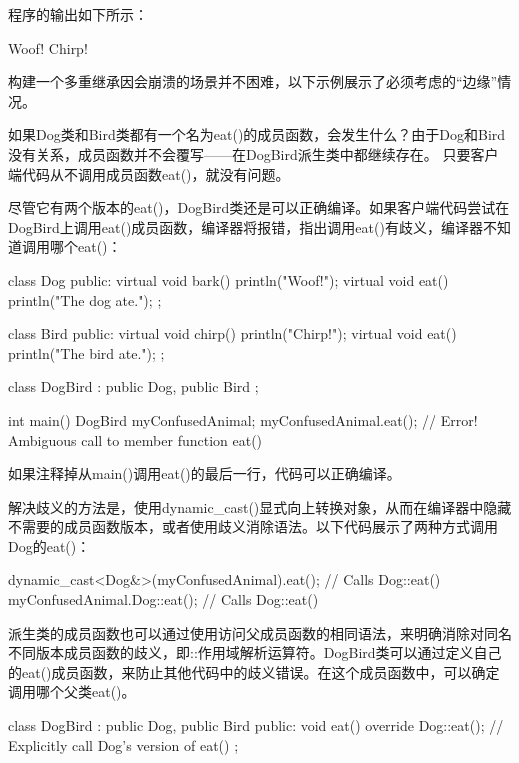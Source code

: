 程序的输出如下所示：

\begin{shell}
Woof!
Chirp!
\end{shell}


构建一个多重继承因会崩溃的场景并不困难，以下示例展示了必须考虑的“边缘”情况。


如果Dog类和Bird类都有一个名为eat()的成员函数，会发生什么？由于Dog和Bird没有关系，成员函数并不会覆写——在DogBird派生类中都继续存在。 只要客户端代码从不调用成员函数eat()，就没有问题。

尽管它有两个版本的eat()，DogBird类还是可以正确编译。如果客户端代码尝试在DogBird上调用eat()成员函数，编译器将报错，指出调用eat()有歧义，编译器不知道调用哪个eat()：

\begin{cpp}
class Dog
{
    public:
        virtual void bark() { println("Woof!"); }
        virtual void eat() { println("The dog ate."); }
};

class Bird
{
    public:
        virtual void chirp() { println("Chirp!"); }
        virtual void eat() { println("The bird ate."); }
};

class DogBird : public Dog, public Bird
{
};

int main()
{
    DogBird myConfusedAnimal;
    myConfusedAnimal.eat(); // Error! Ambiguous call to member function eat()
}
\end{cpp}

如果注释掉从main()调用eat()的最后一行，代码可以正确编译。

解决歧义的方法是，使用dynamic\_cast()显式向上转换对象，从而在编译器中隐藏不需要的成员函数版本，或者使用歧义消除语法。以下代码展示了两种方式调用Dog的eat()：

\begin{cpp}
dynamic_cast<Dog&>(myConfusedAnimal).eat(); // Calls Dog::eat()
myConfusedAnimal.Dog::eat(); // Calls Dog::eat()
\end{cpp}

派生类的成员函数也可以通过使用访问父成员函数的相同语法，来明确消除对同名不同版本成员函数的歧义，即::作用域解析运算符。DogBird类可以通过定义自己的eat()成员函数，来防止其他代码中的歧义错误。在这个成员函数中，可以确定调用哪个父类eat()。

\begin{cpp}
class DogBird : public Dog, public Bird
{
    public:
        void eat() override
        {
            Dog::eat(); // Explicitly call Dog's version of eat()
        }
};
\end{cpp}

